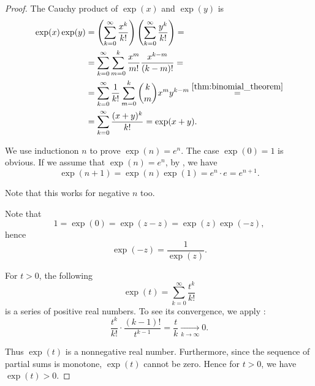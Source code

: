 \begin{proof}
   The Cauchy product of \( \exp(x) \) and \( \exp(y) \) is
  \begin{align*}
    \exp(x) \exp(y)
    &=
    \left( \sum_{k=0}^\infty \frac {x^k} {k!} \right) \left( \sum_{k=0}^\infty \frac {y^k} {k!} \right)
    = \\ &=
    \sum_{k=0}^\infty \sum_{m=0}^k \frac {x^m} {m!} \frac {x^{k-m}} {(k-m)!}
    = \\ &=
    \sum_{k=0}^\infty \frac 1 {k!} \sum_{m=0}^k \binom{k}{m} x^m y^{k-m}
    \overset {\ref{thm:binomial_theorem}} = \\ &=
    \sum_{k=0}^\infty \frac {(x + y)^k} {k!}
    =
    \exp(x + y).
  \end{align*}

   We use induction\IND on \( n \) to prove \( \exp(n) = e^n \). The case \( \exp(0) = 1 \) is obvious. If we assume that \( \exp(n) = e^n \), by , we have
  \begin{equation*}
    \exp(n + 1)
    =
    \exp(n) \exp(1)
    =
    e^n \cdot e
    =
    e^{n+1}.
  \end{equation*}

  Note that this works for negative \( n \) too.

   Note that
  \begin{equation*}
    1 = \exp(0) = \exp(z - z) = \exp(z) \exp(-z),
  \end{equation*}
  hence
  \begin{equation*}
    \exp(-z) = \frac 1 {\exp(z)}.
  \end{equation*}

   For \( t > 0 \), the following
  \begin{equation*}
    \exp(t) = \sum_{k=0}^\infty \frac {t^k} {k!}
  \end{equation*}
  is a series of positive real numbers. To see its convergence, we apply :
  \begin{equation*}
    \frac {t^k} {k!} \cdot \frac {(k-1)!} {t^{k-1}}
    =
    \frac t k
    \xrightarrow[k \to \infty]{} 0.
  \end{equation*}

  Thus \( \exp(t) \) is a nonnegative real number. Furthermore, since the sequence of partial sums is monotone, \( \exp(t) \) cannot be zero. Hence for \( t > 0 \), we have \( \exp(t) > 0 \).


\end{proof}
